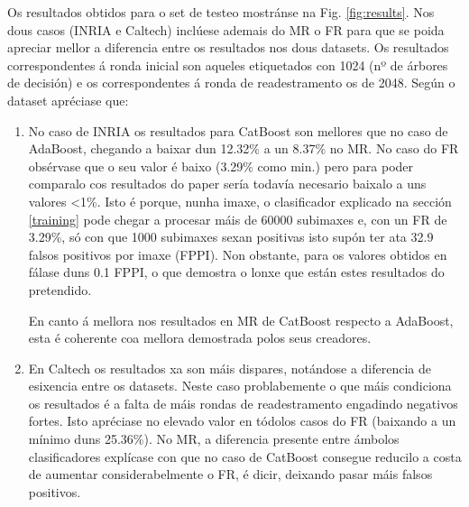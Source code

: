 \documentclass[galician]{./head/uvigo-tfg}
\begin{document}
    Os resultados obtidos para o set de testeo mostránse na Fig. \ref{fig:results}. Nos dous casos (INRIA e Caltech) inclúese ademais do MR o FR para que se poida apreciar mellor a diferencia entre os resultados nos dous datasets. Os resultados correspondentes á ronda inicial son aqueles etiquetados con 1024 (nº de árbores de decisión) e os correspondentes á ronda de readestramento os de 2048. Según o dataset apréciase que:
    \begin{enumerate}
        \item No caso de INRIA os resultados para CatBoost son mellores que no caso de AdaBoost, chegando a baixar dun 12.32\% a un 8.37\% no MR. No caso do FR obsérvase que o seu valor é baixo (3.29\% como min.) pero para poder comparalo cos resultados do paper \cite{zhang} sería todavía necesario baixalo a uns valores <1\%. Isto é porque, nunha imaxe, o clasificador explicado na sección \ref{training} pode chegar a procesar máis de 60000 subimaxes e, con un FR de 3.29\%, só con que 1000 subimaxes sexan positivas isto supón ter ata 32.9 falsos positivos por imaxe (FPPI). Non obstante, para os valores obtidos en \cite{zhang} fálase duns 0.1 FPPI, o que demostra o lonxe que están estes resultados do pretendido.
        \par En canto á mellora nos resultados en MR de CatBoost respecto a AdaBoost, esta é coherente coa mellora demostrada polos seus creadores\cite{CatBoost}.
        \item En Caltech os resultados xa son máis dispares, notándose a diferencia de esixencia entre os datasets. Neste caso problabemente o que máis condiciona os resultados é a falta de máis rondas de readestramento engadindo negativos fortes. Isto apréciase no elevado valor en tódolos casos do FR (baixando a un mínimo duns 25.36\%). No MR, a diferencia presente entre ámbolos clasificadores explícase con que no caso de CatBoost consegue reducilo a costa de aumentar considerabelmente o FR, é dicir, deixando pasar máis falsos positivos.
        
    \end{enumerate}
\end{document}
